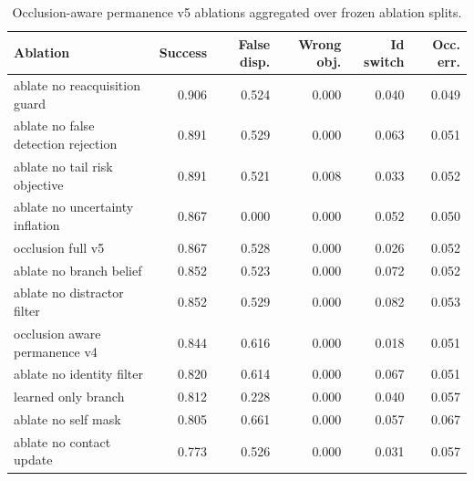 \begin{table}[t]
\centering
\caption{Occlusion-aware permanence v5 ablations aggregated over frozen ablation splits.}
\label{tab:ablation}
\small
\begin{tabular}{lrrrrr}
\toprule
Ablation & Success & False disp. & Wrong obj. & Id switch & Occ. err. \\
\midrule
ablate no reacquisition guard & 0.906 & 0.524 & 0.000 & 0.040 & 0.049 \\
ablate no false detection rejection & 0.891 & 0.529 & 0.000 & 0.063 & 0.051 \\
ablate no tail risk objective & 0.891 & 0.521 & 0.008 & 0.033 & 0.052 \\
ablate no uncertainty inflation & 0.867 & 0.000 & 0.000 & 0.052 & 0.050 \\
occlusion full v5 & 0.867 & 0.528 & 0.000 & 0.026 & 0.052 \\
ablate no branch belief & 0.852 & 0.523 & 0.000 & 0.072 & 0.052 \\
ablate no distractor filter & 0.852 & 0.529 & 0.000 & 0.082 & 0.053 \\
occlusion aware permanence v4 & 0.844 & 0.616 & 0.000 & 0.018 & 0.051 \\
ablate no identity filter & 0.820 & 0.614 & 0.000 & 0.067 & 0.051 \\
learned only branch & 0.812 & 0.228 & 0.000 & 0.040 & 0.057 \\
ablate no self mask & 0.805 & 0.661 & 0.000 & 0.057 & 0.067 \\
ablate no contact update & 0.773 & 0.526 & 0.000 & 0.031 & 0.057 \\
\bottomrule
\end{tabular}
\end{table}
